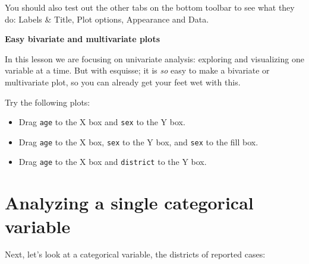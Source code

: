 \documentclass[
  letterpaper,
  DIV=11,
  numbers=noendperiod]{scrreprt}
\newenvironment{Shaded}{\begin{snugshade}}{\end{snugshade}}
\newcommand{\DocumentationTok}[1]{\textcolor[rgb]{0.37,0.37,0.37}{\textit{#1}}}
\newcommand{\NormalTok}[1]{\textcolor[rgb]{0.00,0.23,0.31}{#1}}
\newcommand{\SpecialCharTok}[1]{\textcolor[rgb]{0.37,0.37,0.37}{#1}}
\begin{document}
You should also test out the other tabs on the bottom toolbar to see
what they do: Labels \& Title, Plot options, Appearance and Data.

\begin{tcolorbox}[enhanced jigsaw, titlerule=0mm, colback=white, left=2mm, breakable, opacitybacktitle=0.6, colbacktitle=quarto-callout-note-color!10!white, colframe=quarto-callout-note-color-frame, bottomtitle=1mm, opacityback=0, coltitle=black, arc=.35mm, toptitle=1mm, title=\textcolor{quarto-callout-note-color}{\faInfo}\hspace{0.5em}{Challenge}, leftrule=.75mm, toprule=.15mm, bottomrule=.15mm, rightrule=.15mm]

\textbf{Easy bivariate and multivariate plots}

In this lesson we are focusing on univariate analysis: exploring and
visualizing one variable at a time. But with esquisse; it is \emph{so}
easy to make a bivariate or multivariate plot, so you can already get
your feet wet with this.

Try the following plots:

\begin{itemize}
\item
  Drag \texttt{age} to the X box and \texttt{sex} to the Y box.
\item
  Drag \texttt{age} to the X box, \texttt{sex} to the Y box, and
  \texttt{sex} to the fill box.
\item
  Drag \texttt{age} to the X box and \texttt{district} to the Y box.
\end{itemize}

\end{tcolorbox}

\section{Analyzing a single categorical
variable}\label{analyzing-a-single-categorical-variable}

Next, let's look at a categorical variable, the districts of reported
cases:

\begin{Shaded}
\end{Shaded}
\end{document}
